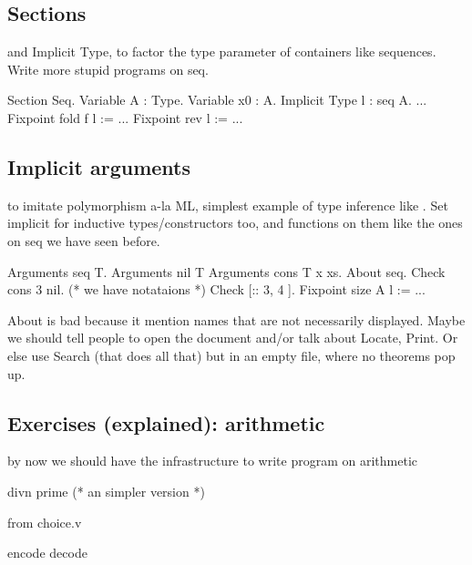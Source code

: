 \subsection{Sections}
and Implicit Type, to factor the type parameter of containers like
sequences.  Write more stupid programs on seq.

\begin{coq}{}
Section Seq.
Variable A : Type.
Variable x0 : A.
Implicit Type l : seq A.
...
Fixpoint fold f l := ...
Fixpoint rev l := ...
\end{coq}


\subsection{Implicit arguments}
to imitate polymorphism a-la ML, simplest example of type inference
like .  Set implicit for inductive types/constructors too,
and functions on them like the ones on seq we have seen before.

\begin{coq}{}
Arguments seq {T}.
Arguments nil {T}
Arguments cons {T} x xs.
About seq.
Check cons 3 nil.
(* we have notataions *)
Check [:: 3, 4 ].
Fixpoint size A l := ...
\end{coq}

About is bad because it mention names that are not necessarily displayed.
Maybe we should tell people to open the document and/or talk about Locate,
Print.  Or else use Search (that does all that) but in an empty
file, where no theorems pop up.

\subsection{Exercises (explained): arithmetic}
by now we should have the infrastructure to write program on arithmetic

\begin{coq}{}
divn
prime  (* an simpler version *)
\end{coq}

from choice.v

\begin{coq}{}
encode
decode
\end{coq}
